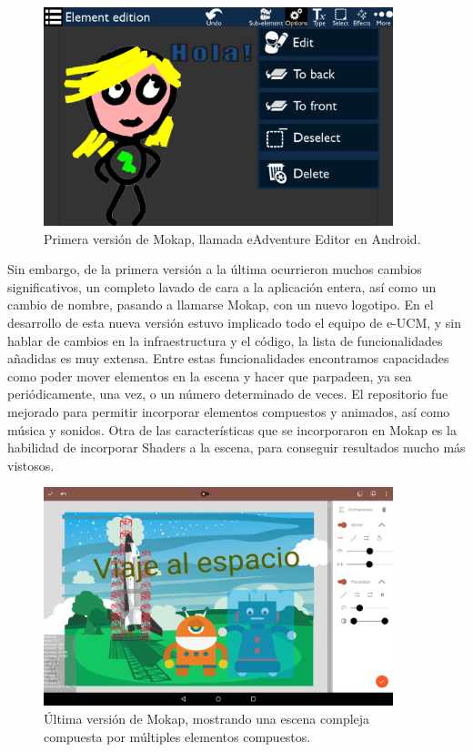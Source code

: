\begin{figure}[htb]
	\centerline{\includegraphics[height=2.5in]{figures/mokap1.png}}
	\caption[Mokap - eAdventure Editor]{Primera versión de Mokap, llamada eAdventure Editor en Android.}
	\label{mokap1}
\end{figure}

Sin embargo, de la primera versión a la última ocurrieron muchos cambios significativos, un completo lavado de cara a la aplicación entera, así como un cambio de nombre, pasando a llamarse Mokap, con un nuevo logotipo. En el desarrollo de esta nueva versión estuvo implicado todo el equipo de e-UCM, y sin hablar de cambios en la infraestructura y el código, la lista de funcionalidades añadidas es muy extensa. Entre estas funcionalidades encontramos capacidades como poder mover elementos en la escena y hacer que parpadeen, ya sea periódicamente, una vez, o un número determinado de veces. El repositorio fue mejorado para permitir incorporar elementos compuestos y animados, así como música y sonidos. Otra de las características que se incorporaron en Mokap es la habilidad de incorporar Shaders a la escena, para conseguir resultados mucho más vistosos.

\begin{figure}[htb]
	\centerline{\includegraphics[height=2.5in]{figures/mokap2.png}}
	\caption[Mokap - Última Versión]{Última versión de Mokap, mostrando una escena compleja compuesta por múltiples elementos compuestos.}
	\label{mokap2}
\end{figure}

